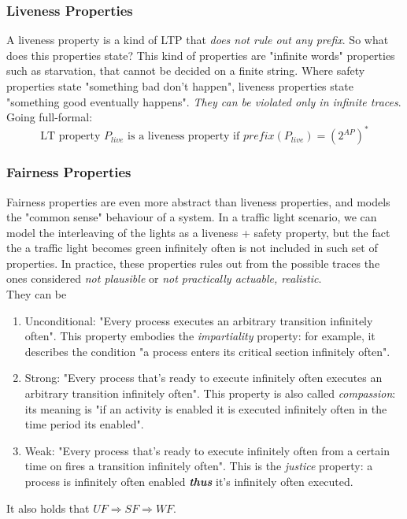 \documentclass{article}
\begin{document}
				\subsubsection{Liveness Properties}
					A liveness property is a kind of LTP that \emph{does not rule out any prefix}. So what does this properties state? This kind of properties are "infinite words" properties such as starvation, that cannot be decided on a finite string. Where safety properties state "something bad don't happen", liveness properties state "something good eventually happens". \emph{They can be violated only in infinite traces}.\\
					Going full-formal:
					\begin{equation}
						\text{LT property } P_{live} \text{ is a liveness property if } prefix(P_{live}) = (2^{AP})^{\ast}
					\end{equation}
					
				\subsubsection{Fairness Properties}
					Fairness properties are even more abstract than liveness properties, and models the "common sense" behaviour of a system. In a traffic light scenario, we can model the interleaving of the lights as a liveness + safety property, but the fact the a traffic light becomes green infinitely often is not included in such set of properties. In practice, these properties rules out from the possible traces the ones considered \emph{not plausible} or \emph{not practically actuable, realistic}.\\
					They can be 
					\begin{enumerate}
						\item Unconditional: "Every process executes an arbitrary transition infinitely often". This property embodies the \emph{impartiality} property: for example, it describes the condition "a process enters its critical section infinitely often".
						\item Strong: "Every process that's ready to execute infinitely often executes an arbitrary transition infinitely often". This property is also called \emph{compassion}: its meaning is "if an activity is enabled it is executed infinitely often in the time period its enabled".
						\item Weak: "Every process that's ready to execute infinitely often from a certain time on fires a transition infinitely often". This is the \emph{justice} property: a process is infinitely often enabled \emph{\textbf{thus}} it's infinitely often executed.
					\end{enumerate}
					It also holds that $UF \Rightarrow SF \Rightarrow WF$. 
					
\end{document}
